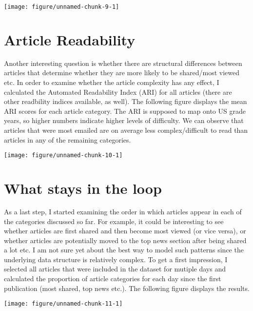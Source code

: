 \documentclass[12pt]{article}
\begin{document}
\begin{doublespace}
\begin{knitrout}
\color{fgcolor}
\texttt{[image: figure/unnamed-chunk-9-1]} 

\end{knitrout}

\section{Article Readability}

Another interesting question is whether there are structural differences between articles that determine whether they are more likely to be shared/most viewed etc. In order to examine whether the article complexity has any effect, I calculated the Automated Readability Index (ARI) for all articles (there are other readbility indices available, as well). The following figure displays the mean ARI scores for each article category. The ARI is supposed to map onto US grade years, so higher numbers indicate higher levels of difficulty. We can observe that articles that were most emailed are on average less complex/difficult to read than articles in any of the remaining categories.

\begin{knitrout}
\color{fgcolor}
\texttt{[image: figure/unnamed-chunk-10-1]} 

\end{knitrout}


\section{What stays in the loop}

As a last step, I started examining the order in which articles appear in each of the categories discussed so far. For example, it could be interesting to see whether articles are first shared and then become most viewed (or vice versa), or whether articles are potentially moved to the top news section after being shared a lot etc. I am not sure yet about the best way to model such patterns since the underlying data structure is relatively complex. To get a first impression, I selected all articles that were included in the dataset for mutiple days and calculated the proportion of article categories for each day since the first publication (most shared, top news etc.). The following figure displays the results.

\begin{knitrout}
\color{fgcolor}
\texttt{[image: figure/unnamed-chunk-11-1]} 


\end{knitrout}
\end{doublespace}
\end{document}
